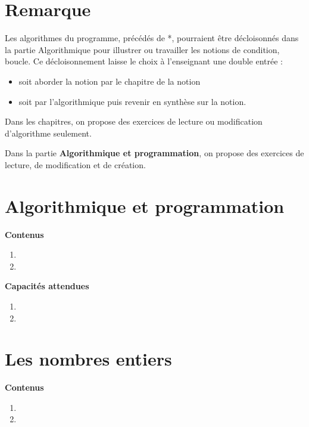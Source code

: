 \documentclass[10pt,a4paper]{article}
\begin{document}
 


\section*{Remarque}

Les algorithmes du programme, précédés de *, pourraient être décloisonnés dans la partie Algorithmique pour illustrer ou travailler les notions de condition, boucle.
Ce décloisonnement laisse le choix à l'enseignant une double entrée : 
\begin{itemize}
\item soit aborder la notion par le chapitre de la notion
\item soit par l'algorithmique puis revenir en synthèse sur la notion.
\end{itemize}

Dans les chapitres, on propose des exercices de lecture ou modification d'algorithme seulement. 

Dans la partie \textbf{Algorithmique et programmation}, on propose des exercices de  lecture, de  modification et de création.


\section{Algorithmique et programmation}

\textbf{Contenus}

\begin{enumerate} 
\item 
\item 
\end{enumerate}


\textbf{Capacités attendues}

\begin{enumerate}
\item 
\item 
\end{enumerate}


\section{Les nombres entiers}

\textbf{Contenus}

\begin{enumerate} 
\item 
\item 
\end{enumerate}
\end{document}
